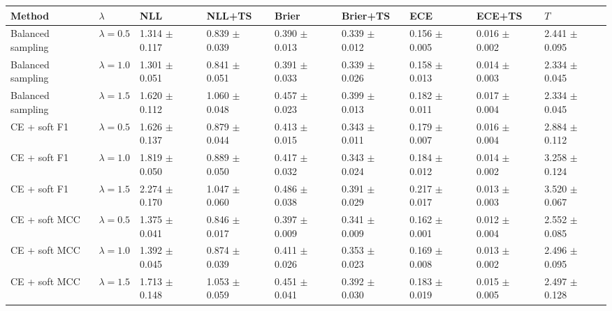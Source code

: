 \begin{tabular}{lllllllll}
\toprule
Method & $\lambda$ & NLL & NLL+TS & Brier & Brier+TS & ECE & ECE+TS & $T$\\
\midrule
Balanced sampling & $\lambda=0.5$ & \num{1.314} $\pm$ \num{0.117} & \num{0.839} $\pm$ \num{0.039} & \num{0.390} $\pm$ \num{0.013} & \num{0.339} $\pm$ \num{0.012} & \num{0.156} $\pm$ \num{0.005} & \num{0.016} $\pm$ \num{0.002} & \num{2.441} $\pm$ \num{0.095}\\
Balanced sampling & $\lambda=1.0$ & \num{1.301} $\pm$ \num{0.051} & \num{0.841} $\pm$ \num{0.051} & \num{0.391} $\pm$ \num{0.033} & \num{0.339} $\pm$ \num{0.026} & \num{0.158} $\pm$ \num{0.013} & \num{0.014} $\pm$ \num{0.003} & \num{2.334} $\pm$ \num{0.045}\\
Balanced sampling & $\lambda=1.5$ & \num{1.620} $\pm$ \num{0.112} & \num{1.060} $\pm$ \num{0.048} & \num{0.457} $\pm$ \num{0.023} & \num{0.399} $\pm$ \num{0.013} & \num{0.182} $\pm$ \num{0.011} & \num{0.017} $\pm$ \num{0.004} & \num{2.334} $\pm$ \num{0.045}\\
CE + soft F1 & $\lambda=0.5$ & \num{1.626} $\pm$ \num{0.137} & \num{0.879} $\pm$ \num{0.044} & \num{0.413} $\pm$ \num{0.015} & \num{0.343} $\pm$ \num{0.011} & \num{0.179} $\pm$ \num{0.007} & \num{0.016} $\pm$ \num{0.004} & \num{2.884} $\pm$ \num{0.112}\\
CE + soft F1 & $\lambda=1.0$ & \num{1.819} $\pm$ \num{0.050} & \num{0.889} $\pm$ \num{0.050} & \num{0.417} $\pm$ \num{0.032} & \num{0.343} $\pm$ \num{0.024} & \num{0.184} $\pm$ \num{0.012} & \num{0.014} $\pm$ \num{0.002} & \num{3.258} $\pm$ \num{0.124}\\
CE + soft F1 & $\lambda=1.5$ & \num{2.274} $\pm$ \num{0.170} & \num{1.047} $\pm$ \num{0.060} & \num{0.486} $\pm$ \num{0.038} & \num{0.391} $\pm$ \num{0.029} & \num{0.217} $\pm$ \num{0.017} & \num{0.013} $\pm$ \num{0.003} & \num{3.520} $\pm$ \num{0.067}\\
CE + soft MCC & $\lambda=0.5$ & \num{1.375} $\pm$ \num{0.041} & \num{0.846} $\pm$ \num{0.017} & \num{0.397} $\pm$ \num{0.009} & \num{0.341} $\pm$ \num{0.009} & \num{0.162} $\pm$ \num{0.001} & \num{0.012} $\pm$ \num{0.004} & \num{2.552} $\pm$ \num{0.085}\\
CE + soft MCC & $\lambda=1.0$ & \num{1.392} $\pm$ \num{0.045} & \num{0.874} $\pm$ \num{0.039} & \num{0.411} $\pm$ \num{0.026} & \num{0.353} $\pm$ \num{0.023} & \num{0.169} $\pm$ \num{0.008} & \num{0.013} $\pm$ \num{0.002} & \num{2.496} $\pm$ \num{0.095}\\
CE + soft MCC & $\lambda=1.5$ & \num{1.713} $\pm$ \num{0.148} & \num{1.053} $\pm$ \num{0.059} & \num{0.451} $\pm$ \num{0.041} & \num{0.392} $\pm$ \num{0.030} & \num{0.183} $\pm$ \num{0.019} & \num{0.015} $\pm$ \num{0.005} & \num{2.497} $\pm$ \num{0.128}\\

\end{tabular}
